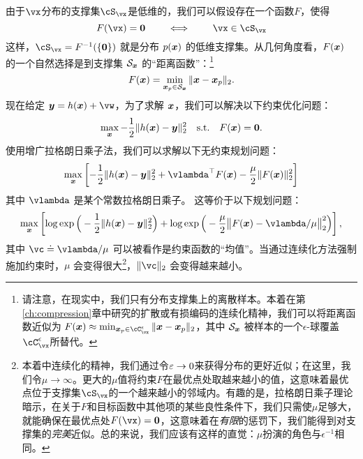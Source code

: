 \documentclass[../../book-main_zh.tex]{subfiles}
\begin{document}
由于\(\vx\)分布的支撑集\(\cS_{\vx}\)是低维的，我们可以假设存在一个函数\(F\)，使得
\begin{equation}
  F(\vx) = \boldsymbol{0} \qquad \iff \qquad \vx \in \cS_{\vx}
\end{equation}
这样，\(\cS_{\vx} = F^{-1}(\{\vzero\})\) 就是分布 $p(\bm{x})$ 的低维支撑集。从几何角度看，$F(\bm{x})$ 的一个自然选择是到支撑集 $\mathcal{S}_{\bm{x}}$ 的“距离函数”：\footnote{请注意，在现实中，我们只有分布支撑集上的离散样本。本着在第\ref{ch:compression}章中研究的扩散或有损编码的连续化精神，我们可以将距离函数近似为 $    F(\x) \approx \min_{\x_p \in \cC_{\vx}^{\epsilon}} \|\x - \x_p\|_2$，其中 $\mathcal{S}_{\bm{x}}$ 被样本的一个$\epsilon$-球覆盖\(\cC_{\vx}^{\epsilon}\)所替代。}
\begin{equation}
    F(\bm{x}) = \min_{\bm{x}_p \in \mathcal{S}_{\bm{x}}} \|\bm{x} - \bm{x}_p\|_2. 
\end{equation}
现在给定 $\y = h(\x) +\vw$，为了求解 $\bm{x}$，我们可以解决以下约束优化问题：
\begin{equation}
    \max_{\bm{x}} - \frac{1}{2}\|h(\bm{x}) - \bm{y}\|_2^2 \quad \mbox{s.t.} \quad F(\bm{x}) = \boldsymbol{0}. 
\end{equation}
使用增广拉格朗日乘子法，我们可以求解以下无约束规划问题：
\begin{equation}
   \max_{\x} \left[-\frac{1}{2}\|h(\x) - \y\|_2^2  + \vlambda^{\top} F(\x) - \frac{\mu}{2} \|F(\x)\|_2^2\right]
\end{equation}
其中 $\vlambda$ 是某个常数拉格朗日乘子。
这等价于以下规划问题：
\begin{equation}\label{eq:lagrange_multiplier_continuation}
\max_{\x} \left[\log \exp\Big(- \frac{1}{2}\|h(\x) - \y\|_2^2\Big) + \log \exp\Big( - \frac{\mu}{2} \big\|F(\x) - \vlambda/\mu\big\|_2^2\Big)\right],
\end{equation} 
其中 $\vc \doteq {\vlambda}/{\mu}$ 可以被看作是约束函数的“均值”。当通过连续化方法强制施加约束时，$\mu$ 会变得很大\footnote{本着中连续化的精神，我们通过令\(\varepsilon \to 0\)来获得分布的更好近似；在这里，我们令\(\mu \to \infty\)。更大的\(\mu\)值将约束\(F\)在最优点处取越来越小的值，这意味着最优点位于支撑集\(\cS_{\vx}\)的一个越来越小的邻域内。有趣的是，拉格朗日乘子理论暗示，在关于\(F\)和目标函数中其他项的某些良性条件下，我们只需使\(\mu\)足够大，就能确保在最优点处\(F(\vx) = \vzero\)，这意味着在\textit{有限}的惩罚下，我们能得到对支撑集的\textit{完美}近似。总的来说，我们应该有这样的直觉：\(\mu\)扮演的角色与\(\epsilon^{-1}\)相同。}，$\|\vc\|_2$ 会变得越来越小。
\end{document}
